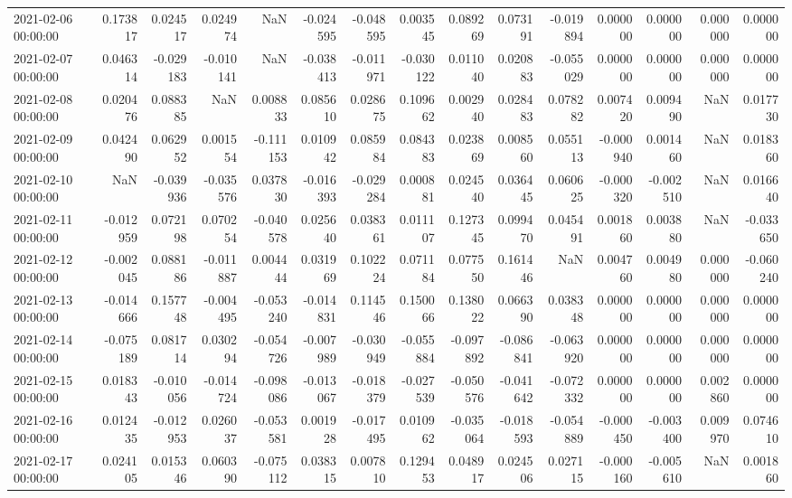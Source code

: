 \begin{tabular}{lrrrrrrrrrrrrrr}
2021-02-06 00:00:00 & 0.173817 & 0.024517 & 0.024974 & NaN & -0.024595 & -0.048595 & 0.003545 & 0.089269 & 0.073191 & -0.019894 & 0.000000 & 0.000000 & 0.000000 & 0.000000 \\
2021-02-07 00:00:00 & 0.046314 & -0.029183 & -0.010141 & NaN & -0.038413 & -0.011971 & -0.030122 & 0.011040 & 0.020883 & -0.055029 & 0.000000 & 0.000000 & 0.000000 & 0.000000 \\
2021-02-08 00:00:00 & 0.020476 & 0.088385 & NaN & 0.008833 & 0.085610 & 0.028675 & 0.109662 & 0.002940 & 0.028483 & 0.078282 & 0.007420 & 0.009490 & NaN & 0.017730 \\
2021-02-09 00:00:00 & 0.042490 & 0.062952 & 0.001554 & -0.111153 & 0.010942 & 0.085984 & 0.084383 & 0.023869 & 0.008560 & 0.055113 & -0.000940 & 0.001460 & NaN & 0.018360 \\
2021-02-10 00:00:00 & NaN & -0.039936 & -0.035576 & 0.037830 & -0.016393 & -0.029284 & 0.000881 & 0.024540 & 0.036445 & 0.060625 & -0.000320 & -0.002510 & NaN & 0.016640 \\
2021-02-11 00:00:00 & -0.012959 & 0.072198 & 0.070254 & -0.040578 & 0.025640 & 0.038361 & 0.011107 & 0.127345 & 0.099470 & 0.045491 & 0.001860 & 0.003880 & NaN & -0.033650 \\
2021-02-12 00:00:00 & -0.002045 & 0.088186 & -0.011887 & 0.004444 & 0.031969 & 0.102224 & 0.071184 & 0.077550 & 0.161446 & NaN & 0.004760 & 0.004980 & 0.000000 & -0.060240 \\
2021-02-13 00:00:00 & -0.014666 & 0.157748 & -0.004495 & -0.053240 & -0.014831 & 0.114546 & 0.150066 & 0.138022 & 0.066390 & 0.038348 & 0.000000 & 0.000000 & 0.000000 & 0.000000 \\
2021-02-14 00:00:00 & -0.075189 & 0.081714 & 0.030294 & -0.054726 & -0.007989 & -0.030949 & -0.055884 & -0.097892 & -0.086841 & -0.063920 & 0.000000 & 0.000000 & 0.000000 & 0.000000 \\
2021-02-15 00:00:00 & 0.018343 & -0.010056 & -0.014724 & -0.098086 & -0.013067 & -0.018379 & -0.027539 & -0.050576 & -0.041642 & -0.072332 & 0.000000 & 0.000000 & 0.002860 & 0.000000 \\
2021-02-16 00:00:00 & 0.012435 & -0.012953 & 0.026037 & -0.053581 & 0.001928 & -0.017495 & 0.010962 & -0.035064 & -0.018593 & -0.054889 & -0.000450 & -0.003400 & 0.009970 & 0.074610 \\
2021-02-17 00:00:00 & 0.024105 & 0.015346 & 0.060390 & -0.075112 & 0.038315 & 0.007810 & 0.129453 & 0.048917 & 0.024506 & 0.027115 & -0.000160 & -0.005610 & NaN & 0.001860 \\

\end{tabular}
